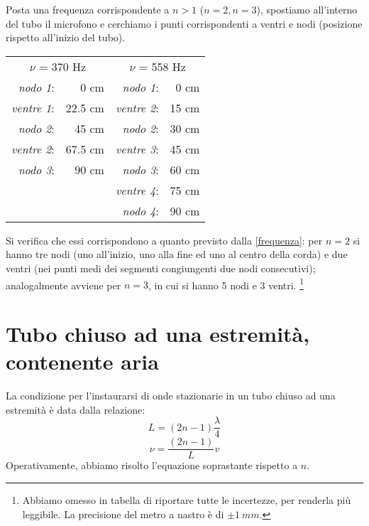 Posta una frequenza corrispondente a $n>1$ ($n=2, n=3$), spostiamo all'interno del tubo il microfono e cerchiamo i punti corrispondenti a ventri e nodi (posizione rispetto all'inizio del tubo).\\

\begin{center}
\begin{tabular}{r r r r}

\multicolumn{2}{c}{$\nu$ = 370 Hz}& \multicolumn{2}{c}{$\nu$ = 558 Hz}\\
\textit{nodo 1}:& 0 cm & \hspace{2cm}\textit{nodo 1}:& 0 cm\\
\textit{ventre 1}:& 22.5 cm & \hspace{2cm}\textit{ventre 2}:& 15 cm\\
\textit{nodo 2}:& 45 cm &\hspace{2cm}\textit{nodo 2}:& 30 cm\\
\textit{ventre 2}:& 67.5 cm &\hspace{2cm}\textit{ventre 3}:& 45 cm\\
\textit{nodo 3}:& 90 cm &\hspace{2cm} \textit{nodo 3}:& 60 cm\\
& & \textit{ventre 4}:& 75 cm \\
& & \textit{nodo 4}:& 90 cm \\
\end{tabular}
\end{center}

Si verifica che essi corrispondono a quanto previsto dalla \ref{frequenza}: per $n=2$ si hanno tre nodi (uno all'inizio, uno alla fine ed uno al centro della corda) e due ventri (nei punti medi dei segmenti congiungenti due nodi consecutivi); analogalmente avviene per $n=3$, in cui si hanno 5 nodi e 3 ventri. \footnote{Abbiamo omesso in tabella di riportare tutte le incertezze, per renderla più leggibile. La precisione del metro a nastro è di $\pm1\ mm$.}

\section{Tubo chiuso ad una estremità, contenente aria}

La condizione per l'instaurarsi di onde stazionarie in un tubo chiuso ad una estremità è data dalla relazione:
\\
\begin{equation}
 L=(2n-1)\frac{\lambda}{4}
\end{equation}
\begin{equation}\label{freq2}
\nu=\frac{(2n-1)}{L}v
\end{equation}
Operativamente, abbiamo risolto l'equazione soprastante rispetto a $n$.

